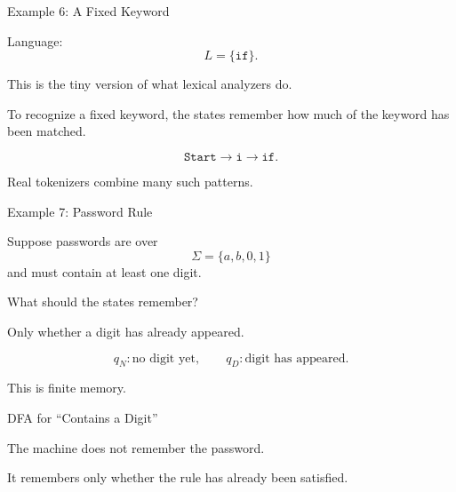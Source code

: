 \documentclass[10pt,aspectratio=169]{beamer}
\begin{document}
\begin{frame}{Example 6: A Fixed Keyword}

Language:
\[
L=\{\texttt{if}\}.
\]

\pause

This is the tiny version of what lexical analyzers do.

\pause

To recognize a fixed keyword, the states remember how much of the keyword has been matched.

\[
\texttt{Start}
\rightarrow \texttt{i}\rightarrow \texttt{if}.
\]

\pause

Real tokenizers combine many such patterns.

\end{frame}

\begin{frame}{Example 7: Password Rule}

Suppose passwords are over
\[
\Sigma=\{a,b,0,1\}
\]
and must contain at least one digit.

\pause

What should the states remember?

\pause

Only whether a digit has already appeared.

\[
q_N: \text{no digit yet},
\qquad
q_D: \text{digit has appeared}.
\]

\pause

This is finite memory.

\end{frame}

\begin{frame}{DFA for ``Contains a Digit''}

\begin{center}
\end{center}

\pause

The machine does not remember the password.

It remembers only whether the rule has already been satisfied.

\end{frame}
\end{document}
